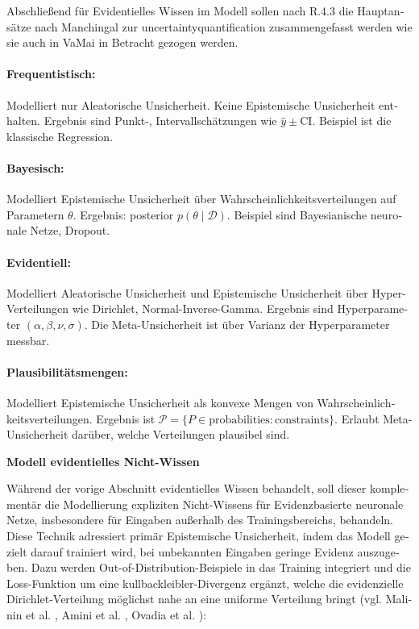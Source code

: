 \begin{otherlanguage}{ngerman}
Abschließend für Evidentielles Wissen im Modell sollen nach R.4.3 die Hauptansätze nach Manchingal zur \gls{uncertaintyquantification} zusammengefasst werden wie sie auch in VaMai in Betracht gezogen werden.

\paragraph{Frequentistisch:} Modelliert nur \gls{Aleatorische Unsicherheit}. Keine \gls{Epistemische Unsicherheit} enthalten. Ergebnis sind Punkt-, Intervallschätzungen wie 
\(\hat{y} \pm \text{CI}\). Beispiel ist die klassische Regression.

\paragraph{Bayesisch:} Modelliert \gls{Epistemische Unsicherheit} über Wahrscheinlichkeitsverteilungen auf Parametern \(\theta\). Ergebnis: posterior 
\(p(\theta \mid \mathcal{D})\). Beispiel sind \gls{Bayesianische neuronale Netze}, Dropout.

\paragraph{Evidentiell:} Modelliert \gls{Aleatorische Unsicherheit} und \gls{Epistemische Unsicherheit} über Hyper-Verteilungen wie Dirichlet, Normal-Inverse-Gamma. Ergebnis sind  Hyperparameter \((\alpha, \beta, \nu, \sigma)\). Die Meta-Unsicherheit ist über Varianz der Hyperparameter messbar.

\paragraph{Plausibilitätsmengen:} Modelliert \gls{Epistemische Unsicherheit} als konvexe Mengen von Wahrscheinlichkeitsverteilungen. Ergebnis ist  
\(\mathcal{P} = \{ P \in \text{probabilities} : \text{constraints} \}\). Erlaubt Meta-Unsicherheit darüber, welche Verteilungen plausibel sind.

\par\vspace{1\baselineskip}\noindent



\textbf{Modell evidentielles Nicht-Wissen}

Während der vorige Abschnitt evidentielles Wissen behandelt, soll dieser komplementär die Modellierung expliziten Nicht-Wissens für \gls{Evidenzbasierte neuronale Netze}, insbesondere für Eingaben außerhalb des Trainingsbereichs, behandeln. Diese Technik adressiert primär \gls{Epistemische Unsicherheit}, indem das Modell gezielt darauf trainiert wird, bei unbekannten Eingaben geringe Evidenz auszugeben. Dazu werden \gls{Out-of-Distribution}-Beispiele in das Training integriert und die Loss-Funktion um eine \gls{kullbackleibler}-Divergenz ergänzt, welche die evidenzielle Dirichlet-Verteilung möglichst nahe an eine uniforme Verteilung bringt (vgl. Malinin et al. \parencite[S.3, Z.22-28]{malinin2019uncertainty}, Amini et al. \parencite[S.4, Z.10-16]{amini2020deep}, Ovadia et al. \parencite[S.4, Z.5-15]{ovadia2019can}):


\end{otherlanguage}

